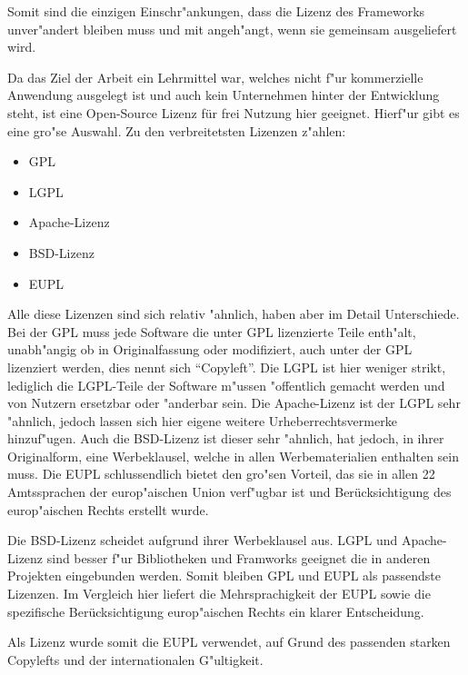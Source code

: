Somit sind die einzigen Einschr"ankungen, dass die Lizenz des Frameworks unver"andert bleiben muss und mit angeh"angt, wenn sie gemeinsam ausgeliefert wird.

Da das Ziel der Arbeit ein Lehrmittel war, welches nicht f"ur kommerzielle Anwendung ausgelegt ist und auch kein Unternehmen hinter der Entwicklung steht, ist eine Open-Source Lizenz für frei Nutzung hier geeignet. Hierf"ur gibt es eine gro"se Auswahl. Zu den verbreitetsten Lizenzen z"ahlen:

\begin{itemize}
	\item \ac{GPL}
	\item \ac{LGPL}
	\item Apache-Lizenz
	\item \ac{BSD}-Lizenz
	\item \ac{EUPL}
\end{itemize}

Alle diese Lizenzen sind sich relativ "ahnlich, haben aber im Detail Unterschiede.
Bei der \ac{GPL} muss jede Software die unter GPL lizenzierte Teile enth"alt, unabh"angig ob in Originalfassung oder modifiziert, auch unter der \ac{GPL} lizenziert werden, dies nennt sich "`Copyleft"'. \cite{gpl_wiki}
Die \ac{LGPL} ist hier weniger strikt, lediglich die \ac{LGPL}-Teile der Software m"ussen "offentlich gemacht werden und von Nutzern ersetzbar oder "anderbar sein. \cite{lgpl_wiki}
Die Apache-Lizenz ist der \ac{LGPL} sehr "ahnlich, jedoch lassen sich hier eigene weitere Urheberrechtsvermerke hinzuf"ugen. \cite{apache_wiki}
Auch die \ac{BSD}-Lizenz ist dieser sehr "ahnlich, hat jedoch, in ihrer Originalform, eine Werbeklausel, welche in allen Werbematerialien enthalten sein muss. \cite{bsd_wiki}
Die \ac{EUPL} schlussendlich bietet den gro"sen Vorteil, das sie in allen 22 Amtssprachen der europ"aischen Union verf"ugbar ist und Berücksichtigung des europ"aischen Rechts erstellt wurde. \cite{eupl_wiki}

Die \ac{BSD}-Lizenz scheidet aufgrund ihrer Werbeklausel aus. \ac{LGPL} und Apache-Lizenz sind besser f"ur Bibliotheken und Framworks geeignet die in anderen Projekten eingebunden werden. Somit bleiben \ac{GPL} und \ac{EUPL} als passendste Lizenzen. Im Vergleich hier liefert die Mehrsprachigkeit der \ac{EUPL} sowie die spezifische Berücksichtigung europ"aischen Rechts ein klarer Entscheidung.

Als Lizenz wurde somit die \ac{EUPL} verwendet, auf Grund des passenden starken Copylefts und der internationalen G"ultigkeit.